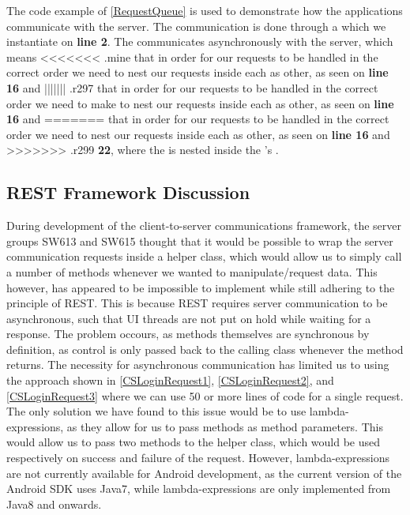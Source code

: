 The code example of \autoref{RequestQueue} is used to demonstrate how the
applications communicate with the server. The communication is done through a
 which we instantiate on \textbf{line 2}. The
 communicates asynchronously with the server, which means
<<<<<<< .mine
that in order for our requests to be handled in the correct order we need to
nest our requests inside each as other, as seen on \textbf{line 16} and
||||||| .r297
that in order for our requests to be handled in the correct order we need to
make to nest our requests inside each as other, as seen on \textbf{line 16} and
=======
that in order for our requests to be handled in the correct order we need to nest our requests inside each as other, as seen on \textbf{line 16} and
>>>>>>> .r299
\textbf{22}, where the  is nested inside the
's .

\subsection{REST Framework Discussion}
\nl
{}\nl
During development of the client-to-server communications framework, the server
groups SW613 and SW615 thought that it would be possible to wrap the server
communication requests inside a helper class, which would allow us to simply
call a number of methods whenever we wanted to manipulate/request data. This
however, has appeared to be impossible to implement while still adhering to the
principle of REST. This is because REST requires server communication to be
asynchronous, such that UI threads are not put on hold while waiting for a
response. The problem occours, as methods themselves are synchronous by
definition, as control is only passed back to the calling class whenever the
method returns. The necessity for asynchronous communication has limited us to
using the approach shown in \autoref{CSLoginRequest1},
\autoref{CSLoginRequest2}, and \autoref{CSLoginRequest3} where we can use 50 or
more lines of code for a single request. The only solution we have found to this
issue would be to use lambda-expressions, as they allow for us to pass methods
as method parameters.
This would allow us to pass two methods to the helper class, which would be used
respectively on success and failure of the request. However, lambda-expressions
are not currently available for Android development, as the current version of
the Android SDK uses Java7, while lambda-expressions are only implemented from
Java8 and onwards.













